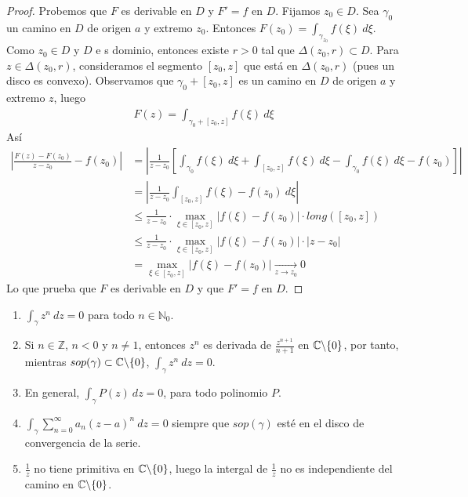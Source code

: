 \begin{proof}
    Probemos que $F$ es derivable en $D$ y $F' = f$ en $D$. Fijamos $z_0 \in D$. Sea $\gamma_0$ un camino en $D$ de origen $a$ y extremo $z_0$. Entonces $F(z_0) = \int_{\gamma_{z_0}}{f(\xi) \ d\xi}$. Como $z_0 \in D$ y $D$ e s dominio, entonces existe $r > 0$ tal que $\Delta(z_0,r) \subset D$. Para $z \in \Delta(z_0,r)$, consideramos el segmento $[z_0,z]$ que está en $\Delta(z_0,r)$ (pues un disco es convexo). Observamos que $\gamma_0 + [z_0,z]$ es un camino en $D$ de origen $a$ y extremo $z$, luego
    \begin{align*}
        F(z) = \int_{\gamma_0 + [z_0,z]}{f(\xi) \ d\xi}
    \end{align*}
    Así
    \begin{align*}
        \left| \frac{F(z) - F(z_0)}{z - z_0} - f(z_0)\right| & = \left| \frac{1}{z - z_0} \left[ \int_{\gamma_0}{f(\xi) \ d\xi} + \int_{[z_0,z]}{f(\xi) \ d\xi} - \int_{\gamma_0}{f(\xi) \ d\xi} - f(z_0) \right] \right| \\
                                                             & = \left| \frac{1}{z - z_0} \int_{[z_0,z]}{f(\xi) - f(z_0)\ d\xi}\right|                                                                                    \\
                                                             & \leq \frac{1}{z - z_0} \cdot \max_{\xi \in [z_0,z]}|f(\xi) - f(z_0)| \cdot long([z_0,z])                                                                   \\
                                                             & \leq \frac{1}{z - z_0} \cdot \max_{\xi \in [z_0,z]}|f(\xi) - f(z_0)| \cdot |z-z_0|                                                                         \\
                                                             & = \max_{\xi \in [z_0,z]}|f(\xi) - f(z_0)| \xrightarrow[z \to z_0]{} 0
    \end{align*}
    Lo que prueba que $F$ es derivable en $D$ y que $F' = f$ en $D$.
\end{proof}

\begin{ejemplo}
    \begin{enumerate}
        \item $\int_{\gamma}{z^n \ dz} = 0$ para todo $n \in \mathbb{N}_0$.
        \item Si $n \in \mathbb{Z}$, $n < 0$ y $n \not = 1$, entonces $z^n$ es derivada de $\frac{z^{n+1}}{n+1}$ en $\mathbb{C} \backslash \{0\}$, por tanto, mientras $sop(\gamma) \subset \mathbb{C} \backslash \{0\}$,  $\int_{\gamma}{z^n \ dz} = 0$.
        \item En general,  $\int_{\gamma}{P(z) \ dz} = 0$, para todo polinomio $P$.
        \item  $\int_{\gamma}{\sum_{n=0}^{\infty}a_n(z-a)^n \ dz} = 0$ siempre que $sop(\gamma)$ esté en el disco de convergencia de la serie.
        \item $\frac{1}{z}$ no tiene primitiva en $\mathbb{C} \backslash \{0\}$, luego la intergal de $\frac{1}{z}$ no es independiente del camino en $\mathbb{C} \backslash \{0\}$.
    \end{enumerate}
\end{ejemplo}

